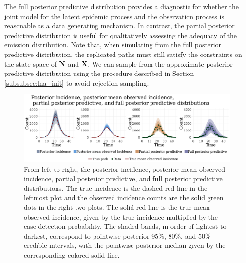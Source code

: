 The full posterior predictive distribution provides a diagnostic for whether the joint model for the latent epidemic process and the observation process is reasonable as a data generating mechanism. In contrast, the partial posterior predictive distribution is useful for qualitatively assessing the adequacy of the emission distribution. Note that, when simulating from the full posterior predictive distribution, the replicated paths must still satisfy the constraints on the state space of $ \mathbf{N} $ and $ \mathbf{X} $. We can sample from the approximate posterior predictive distribution using the procedure described in Section \ref{subsubsec:lna_init} to avoid rejection sampling. 
\begin{figure}[htbp]
	\centering
	\includegraphics[width=\linewidth]{figures/sir_diag_plots}
	\caption[SIR model posterior incidence, posterior mean observed incidence, partial posterior predictive, and full posterior distributions.]{From left to right, the posterior incidence, posterior mean observed incidence, partial posterior predictive, and full posterior predictive distributions. The true incidence is the dashed red line in the leftmost plot and the observed incidence counts are the solid green dots in the right two plots. The solid red line is the true mean observed incidence, given by the true incidence multiplied by the case detection probability. The shaded bands, in order of lightest to darkest, correspond to pointwise posterior 95\%, 80\%, and 50\% credible intervals, with the pointwise posterior median given by the corresponding colored solid line.}
	\label{fig:sirdiagplots}
\end{figure}

